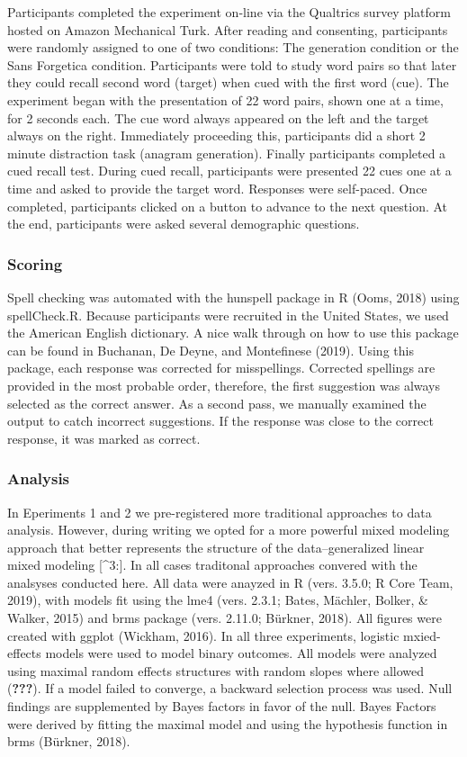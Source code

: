 \documentclass[english,doc]{apa6}
\begin{document}
Participants completed the experiment on-line via the Qualtrics survey platform hosted on Amazon Mechanical Turk. After reading and consenting, participants were randomly assigned to one of two conditions: The generation condition or the Sans Forgetica condition. Participants were told to study word pairs so that later they could recall second word (target) when cued with the first word (cue). The experiment began with the presentation of 22 word pairs, shown one at a time, for 2 seconds each. The cue word always appeared on the left and the target always on the right. Immediately proceeding this, participants did a short 2 minute distraction task (anagram generation). Finally participants completed a cued recall test. During cued recall, participants were presented 22 cues one at a time and asked to provide the target word. Responses were self-paced. Once completed, participants clicked on a button to advance to the next question. At the end, participants were asked several demographic questions.

\hypertarget{scoring}{%
\subsubsection{Scoring}\label{scoring}}

Spell checking was automated with the hunspell package in R (Ooms, 2018) using spellCheck.R. Because participants were recruited in the United States, we used the American English dictionary. A nice walk through on how to use this package can be found in Buchanan, De Deyne, and Montefinese (2019). Using this package, each response was corrected for misspellings. Corrected spellings are provided in the most probable order, therefore, the first suggestion was always selected as the correct answer. As a second pass, we manually examined the output to catch incorrect suggestions. If the response was close to the correct response, it was marked as correct.

\hypertarget{analysis}{%
\subsubsection{Analysis}\label{analysis}}

In Eperiments 1 and 2 we pre-registered more traditional approaches to data analysis. However, during writing we opted for a more powerful mixed modeling approach that better represents the structure of the data--generalized linear mixed modeling {[}\^{}3:{]}. In all cases traditonal approaches convered with the analsyses conducted here. All data were anayzed in R (vers. 3.5.0; R Core Team, 2019), with models fit using the lme4 (vers. 2.3.1; Bates, Mächler, Bolker, \& Walker, 2015) and brms package (vers. 2.11.0; Bürkner, 2018). All figures were created with ggplot (Wickham, 2016). In all three experiments, logistic mxied-effects models were used to model binary outcomes. All models were analyzed using maximal random effects structures with random slopes where allowed ({\textbf{???}}). If a model failed to converge, a backward selection process was used. Null findings are supplemented by Bayes factors in favor of the null. Bayes Factors were derived by fitting the maximal model and using the hypothesis function in brms (Bürkner, 2018).
\end{document}
